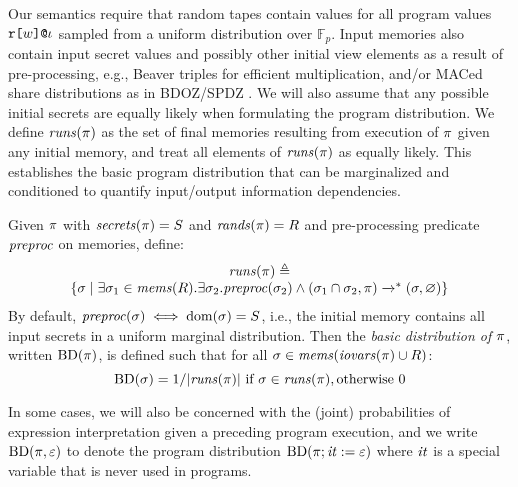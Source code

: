 Our semantics require that random tapes contain values for all program
values $\texttt{r[}w\texttt{]}\texttt{@}\iota$ sampled from a uniform distribution
over $\mathbb{F}_p$. Input memories also contain input secret values
and possibly other initial view elements as a result of
pre-processing, e.g., Beaver triples for efficient multiplication,
and/or MACed share distributions as in BDOZ/SPDZ
\cite{evans2018pragmatic,10.1007/978-3-030-68869-1_3}.  We will also
assume that any possible initial secrets are equally likely when
formulating the program distribution.  We define $\mathit{runs}(\pi)$ as the
set of final memories resulting from execution of $\pi$ given any
initial memory, and treat all elements of $\mathit{runs}(\pi)$ as equally
likely.  This establishes the basic program distribution that can be
marginalized and conditioned to quantify input/output information
dependencies.
\begin{definition}
  \label{def-progtt}
  \label{def-progd}
  \label{definition-progd}
  Given $\pi$ with $\mathit{secrets}(\pi) = S$ and $\mathit{rands}(\pi) = R$ and
  pre-processing predicate $\mathit{preproc}$ on memories, define:
  $$
  \begin{array}{c}
    \mathit{runs}(\pi) \triangleq \\
    \{ \sigma \mid \exists \sigma_1 \in \mathit{mems}(R) . 
    \exists \sigma_2 . \mathit{preproc}(\sigma_2) \wedge
    (\sigma_1 \cap \sigma_2,\pi) \xrightarrow{}^{*} (\sigma,\varnothing) \}
  \end{array}
  $$
  By default, $\mathit{preproc}(\sigma) \iff \mathrm{dom}(\sigma) = S$, i.e.,
  the initial memory contains all input secrets in a uniform
  marginal distribution. Then the \emph{basic distribution of $\pi$}, written $\mathrm{BD}(\pi)$, is
  defined such that for all $\sigma \in \mathit{mems}(\mathit{iovars}(\pi) \cup R)$:
  $$
  \mathrm{BD}(\sigma) =  1 / |\mathit{runs}(\pi)| \ \text{if}\ \sigma \in \mathit{runs}(\pi), \text{otherwise}\ 0
  $$
  
  In some cases, we will also be concerned with the (joint)
  probabilities of expression interpretation given a preceding program
  execution, and we write $\mathrm{BD}(\pi, \varepsilon)$ to denote the program
  distribution $\mathrm{BD}(\pi;\mathit{it} := \varepsilon)$ where $\mathit{it}$ is a
  special variable that is never used in programs.
\end{definition}


